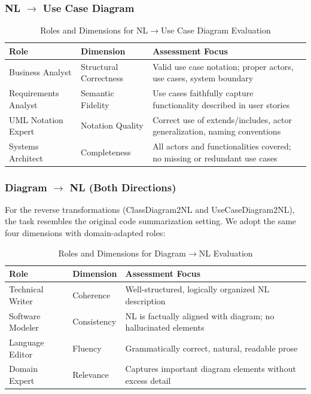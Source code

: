 \documentclass[lettersize,journal]{IEEEtran}
\begin{document}
\subsubsection{NL $\rightarrow$ Use Case Diagram}

\begin{table}[!t]
\centering
\caption{Roles and Dimensions for NL$\rightarrow$Use Case Diagram Evaluation}
\label{tab:nl2uc-roles}
\begin{tabular}{@{}p{2cm}p{1.8cm}p{3.7cm}@{}}
\toprule
\textbf{Role} & \textbf{Dimension} & \textbf{Assessment Focus} \\
\midrule
Business Analyst & Structural Correctness & Valid use case notation; proper actors, use cases, system boundary \\
\addlinespace
Requirements Analyst & Semantic Fidelity & Use cases faithfully capture functionality described in user stories \\
\addlinespace
UML Notation Expert & Notation Quality & Correct use of extends/includes, actor generalization, naming conventions \\
\addlinespace
Systems Architect & Completeness & All actors and functionalities covered; no missing or redundant use cases \\
\bottomrule
\end{tabular}
\end{table}

\subsubsection{Diagram $\rightarrow$ NL (Both Directions)}

For the reverse transformations (ClassDiagram2NL and UseCaseDiagram2NL), the task resembles the original code summarization setting. We adopt the same four dimensions with domain-adapted roles:

\begin{table}[!t]
\centering
\caption{Roles and Dimensions for Diagram$\rightarrow$NL Evaluation}
\label{tab:d2nl-roles}
\begin{tabular}{@{}p{2cm}p{1.8cm}p{3.7cm}@{}}
\toprule
\textbf{Role} & \textbf{Dimension} & \textbf{Assessment Focus} \\
\midrule
Technical Writer & Coherence & Well-structured, logically organized NL description \\
\addlinespace
Software Modeler & Consistency & NL is factually aligned with diagram; no hallucinated elements \\
\addlinespace
Language Editor & Fluency & Grammatically correct, natural, readable prose \\
\addlinespace
Domain Expert & Relevance & Captures important diagram elements without excess detail \\
\bottomrule
\end{tabular}
\end{table}
\end{document}
